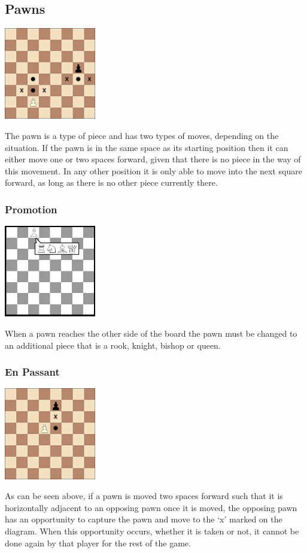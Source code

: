 \documentclass[]{report}
\begin{document}
\subsection{Pawns}
\begin{center}
	\includegraphics[width=0.3\textwidth]{images/boards/pawn_movement}
\end{center}
The pawn is a type of piece and has two types of moves, depending on the situation. If the pawn is in the same space as its starting position then it can either move one or two spaces forward, given that there is no piece in the way of this movement. In any other position it is only able to move into the next square forward, as long as there is no other piece currently there. 
\subsubsection{Promotion}
\begin{center}
	\includegraphics[width=0.3\textwidth]{images/boards/promotion}
\end{center}
When a pawn reaches the other side of the board the pawn must be changed to an additional piece that is a rook, knight, bishop or queen.
\subsubsection{En Passant}
\begin{center}
	\includegraphics[width=0.3\textwidth]{images/boards/en_passant}
\end{center}
As can be seen above, if a pawn is moved two spaces forward such that it is horizontally adjacent to an opposing pawn once it is moved, the opposing pawn has an opportunity to capture the pawn and move to the ‘x' marked on the diagram. When this opportunity occurs, whether it is taken or not, it cannot be done again by that player for the rest of the game.
\end{document}
